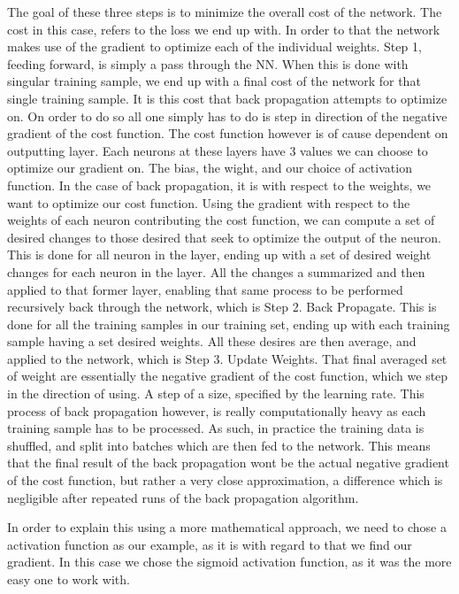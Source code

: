 The goal of these three steps is to minimize the overall cost of the network.
The cost in this case, refers to the loss we end up with. In order to that
the network makes use of the gradient to optimize each of the individual
weights. Step 1, feeding forward, is simply a pass through the \gls{NN}. 
When this is done with singular training sample, we end up with a final 
cost of the network for that single training sample. It is this cost
that back propagation attempts to optimize on. On order to do so
all one simply has to do is step in direction of the negative gradient
of the cost function. The cost function however is of cause dependent
on outputting layer. Each neurons at these layers have 3 values we
can choose to optimize our gradient on. The bias, the wight, and our
choice of activation function. In the case of back propagation,
it is with respect to the weights, we want to optimize our cost function.
Using the gradient with respect to the weights of each neuron contributing
the cost function, we can compute a set of desired changes to those desired
that seek to optimize the output of the neuron. This is done for all neuron
in the layer, ending up with a set of desired weight changes for each neuron
in the layer. All the changes a summarized and then applied to that former
layer, enabling that same process to be performed recursively back through
the network, which is Step 2. Back Propagate. 
This is done for all the training samples in our training set, ending
up with each training sample having a set desired weights. All these
desires are then average, and applied to the network, which is Step 3.
Update Weights. That final averaged set of weight are essentially
the negative gradient of the cost function, which we step in the direction
of using. A step of a size, specified by the learning rate.
This process of back propagation however, is really computationally heavy
as each training sample has to be processed. As such, in practice
the training data is shuffled, and split into batches which are then fed to
the network. This means that the final result of the back propagation
wont be the actual negative gradient of the cost function, but rather a
very close approximation, a difference which is negligible after
repeated runs of the back propagation algorithm.

In order to explain this using a more mathematical approach, we need to chose
a activation function as our example, as it is with regard to that we find our
gradient. In this case we chose the sigmoid activation function, as it was
the more easy one to work with.

